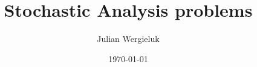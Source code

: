 \documentclass[10pt,twoside,a4paper]{amsart}
\title{Stochastic Analysis problems}\author{Julian Wergieluk}\date{\today}
\begin{document}
\sloppy

\maketitle

\setcounter{tocdepth}{3}
\tableofcontents


\setcounter{secnumdepth}{4}
\renewcommand{\theparagraph}{\arabic{chapter}.\arabic{paragraph}}
\renewcommand{\theenumi}{\Alph{enumi}.}
\renewcommand{\labelenumi}{\theenumi}






%
%
\end{document}
